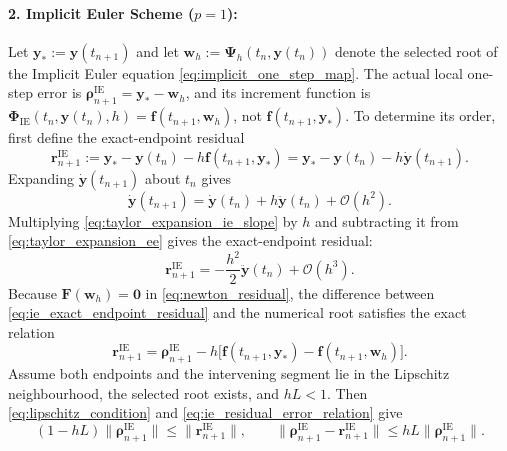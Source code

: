 \documentclass[11pt,a4paper]{article}
\theoremstyle{definition}
\theoremstyle{remark}
\begin{document}
\paragraph{2. Implicit Euler Scheme ($p=1$):}
Let $\mathbf y_*:=\mathbf y(t_{n+1})$ and let $\mathbf w_h:=\boldsymbol\Psi_h(t_n,\mathbf y(t_n))$ denote the selected root of the Implicit Euler equation \eqref{eq:implicit_one_step_map}. The actual local one-step error is $\boldsymbol\rho_{n+1}^{\mathrm{IE}}=\mathbf y_*-\mathbf w_h$, and its increment function is $\boldsymbol\Phi_{\mathrm{IE}}(t_n,\mathbf y(t_n),h)=\mathbf f(t_{n+1},\mathbf w_h)$, not $\mathbf f(t_{n+1},\mathbf y_*)$. To determine its order, first define the exact-endpoint residual
\begin{equation}
\label{eq:ie_exact_endpoint_residual}
\mathbf r_{n+1}^{\mathrm{IE}}
:=\mathbf y_*-\mathbf y(t_n)-h\mathbf f(t_{n+1},\mathbf y_*)
=\mathbf y_*-\mathbf y(t_n)-h\dot{\mathbf y}(t_{n+1}).
\end{equation}
Expanding $\dot{\mathbf{y}}(t_{n+1})$ about $t_n$ gives
\begin{equation}
\label{eq:taylor_expansion_ie_slope}
\dot{\mathbf{y}}(t_{n+1}) = \dot{\mathbf{y}}(t_n) + h \ddot{\mathbf{y}}(t_n) + \mathcal{O}(h^2).
\end{equation}
Multiplying \eqref{eq:taylor_expansion_ie_slope} by $h$ and subtracting it from \eqref{eq:taylor_expansion_ee} gives the exact-endpoint residual:
\begin{equation}
\label{eq:ie_residual_expansion}
\mathbf r_{n+1}^{\mathrm{IE}}
=-\frac{h^2}{2}\ddot{\mathbf y}(t_n)+\mathcal{O}(h^3).
\end{equation}
Because $\mathbf F(\mathbf w_h)=\mathbf0$ in \eqref{eq:newton_residual}, the difference between \eqref{eq:ie_exact_endpoint_residual} and the numerical root satisfies the exact relation
\begin{equation}
\label{eq:ie_residual_error_relation}
\mathbf r_{n+1}^{\mathrm{IE}}
=\boldsymbol\rho_{n+1}^{\mathrm{IE}}
-h\bigl[\mathbf f(t_{n+1},\mathbf y_*)-\mathbf f(t_{n+1},\mathbf w_h)\bigr].
\end{equation}
Assume both endpoints and the intervening segment lie in the Lipschitz neighbourhood, the selected root exists, and $hL<1$. Then \eqref{eq:lipschitz_condition} and \eqref{eq:ie_residual_error_relation} give
\begin{equation}
\label{eq:ie_residual_error_bound}
(1-hL)\|\boldsymbol\rho_{n+1}^{\mathrm{IE}}\|
\le \|\mathbf r_{n+1}^{\mathrm{IE}}\|,
\qquad
\|\boldsymbol\rho_{n+1}^{\mathrm{IE}}-\mathbf r_{n+1}^{\mathrm{IE}}\|
\le hL\|\boldsymbol\rho_{n+1}^{\mathrm{IE}}\|.
\end{equation}
\end{document}
